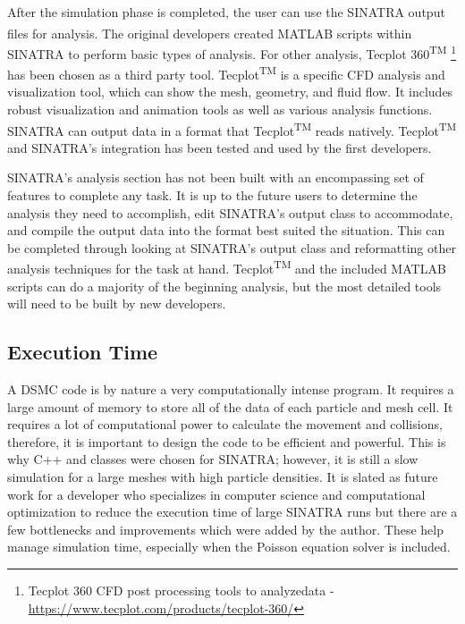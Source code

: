  After the simulation phase is completed, the user can use the SINATRA output files for analysis. The original developers created MATLAB\textsuperscript{\textregistered} scripts within SINATRA to perform basic types of analysis. For other analysis, Tecplot 360\textsuperscript{TM} \footnote{Tecplot 360 CFD post processing tools to analyzedata - \url{https://www.tecplot.com/products/tecplot-360/}} has been chosen as a third party tool. Tecplot\textsuperscript{TM} is a specific CFD analysis and visualization tool, which can show the mesh, geometry, and fluid flow. It includes robust visualization and animation tools as well as various analysis functions. SINATRA can output data in a format that Tecplot\textsuperscript{TM} reads natively. Tecplot\textsuperscript{TM} and SINATRA's integration has been tested and used by the first developers.\par
 \indent SINATRA's analysis section has not been built with an encompassing set of features to complete any task. It is up to the future users to determine the analysis they need to accomplish, edit SINATRA's output class to accommodate, and compile the output data into the format best suited the situation. This can be completed through looking at SINATRA's output class and reformatting other analysis techniques for the task at hand. Tecplot\textsuperscript{TM} and the included MATLAB\textsuperscript{\textregistered} scripts can do a majority of the beginning analysis, but the most detailed tools will need to be built by new developers.

 
\subsection{Execution Time}
\label{sec:execution}
A DSMC code is by nature a very computationally intense program. It requires a large amount of memory to store all of the data of each particle and mesh cell. It requires a lot of computational power to calculate the movement and collisions, therefore, it is important to design the code to be efficient and powerful. This is why C++ and classes were chosen for SINATRA; however, it is still a slow simulation for a large meshes with high particle densities. It is slated as future work for a developer who specializes in computer science and computational optimization to reduce the execution time of large SINATRA runs but there are a few bottlenecks and improvements which were added by the author. These help manage simulation time, especially when the Poisson equation solver is included. \par


